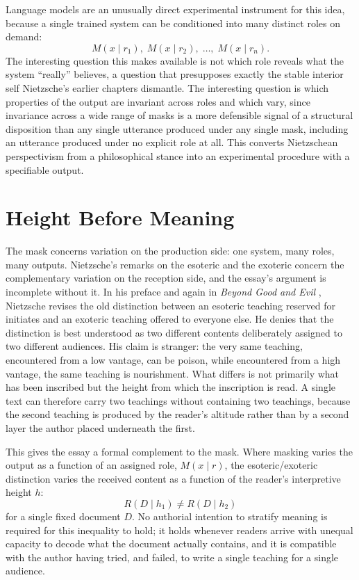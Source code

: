 \documentclass[11pt]{article}
\begin{document}
Language models are an unusually direct experimental instrument for this idea, because a single trained system can be conditioned into many distinct roles on demand:
\[
M(x \mid r_1), \; M(x \mid r_2), \; \ldots, \; M(x \mid r_n).
\]
The interesting question this makes available is not which role reveals what the system ``really'' believes, a question that presupposes exactly the stable interior self Nietzsche's earlier chapters dismantle. The interesting question is which properties of the output are invariant across roles and which vary, since invariance across a wide range of masks is a more defensible signal of a structural disposition than any single utterance produced under any single mask, including an utterance produced under no explicit role at all. This converts Nietzschean perspectivism from a philosophical stance into an experimental procedure with a specifiable output.

\section{Height Before Meaning}

The mask concerns variation on the production side: one system, many roles, many outputs. Nietzsche's remarks on the esoteric and the exoteric concern the complementary variation on the reception side, and the essay's argument is incomplete without it. In his preface and again in \emph{Beyond Good and Evil} \cite[\S 30]{nietzsche1886}, Nietzsche revises the old distinction between an esoteric teaching reserved for initiates and an exoteric teaching offered to everyone else. He denies that the distinction is best understood as two different contents deliberately assigned to two different audiences. His claim is stranger: the very same teaching, encountered from a low vantage, can be poison, while encountered from a high vantage, the same teaching is nourishment. What differs is not primarily what has been inscribed but the height from which the inscription is read. A single text can therefore carry two teachings without containing two teachings, because the second teaching is produced by the reader's altitude rather than by a second layer the author placed underneath the first.

This gives the essay a formal complement to the mask. Where masking varies the output as a function of an assigned role, \(M(x \mid r)\), the esoteric/exoteric distinction varies the received content as a function of the reader's interpretive height \(h\):
\[
R(D \mid h_1) \neq R(D \mid h_2)
\]
for a single fixed document \(D\). No authorial intention to stratify meaning is required for this inequality to hold; it holds whenever readers arrive with unequal capacity to decode what the document actually contains, and it is compatible with the author having tried, and failed, to write a single teaching for a single audience.
\end{document}
